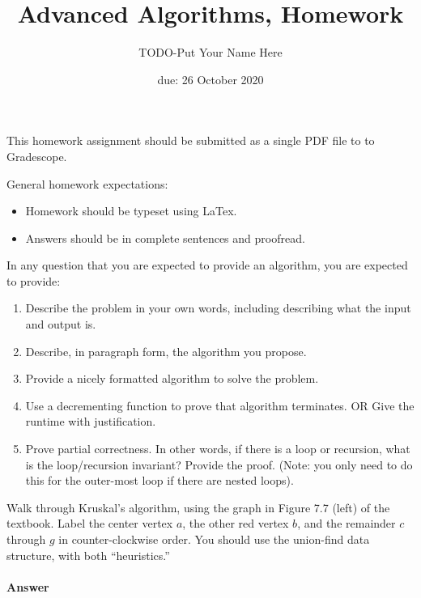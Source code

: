 \documentclass{article}
\title{Advanced Algorithms, Homework \hwnum}
\author{TODO-Put Your Name Here}
\date{due: 26 October 2020}
\begin{document}
\maketitle

This homework assignment should be
submitted as a single PDF file to to Gradescope.

General homework expectations:
\begin{itemize}
    \item Homework should be typeset using LaTex.
    \item Answers should be in complete sentences and proofread.
\end{itemize}

In any question that you are expected to provide an algorithm, you are
expected to provide:
\begin{enumerate}
    \item Describe the problem in your own words, including
        describing what the input and output is.
    \item Describe, in paragraph form, the algorithm you propose.
    \item Provide a nicely formatted algorithm to solve the problem.
    \item Use a decrementing function to prove that algorithm terminates.
            OR  Give the runtime with justification.
    \item Prove partial correctness.  In other words, if there is a loop or
        recursion, what is the loop/recursion invariant? Provide the proof.
        (Note: you only need to do this for the outer-most loop if there are
        nested loops).
\end{enumerate}



\nextprob
{}

Walk through Kruskal's algorithm, using the graph in Figure 7.7 (left) of the
textbook.  Label the center vertex $a$, the other red vertex $b$, and the
remainder $c$ through $g$ in counter-clockwise order.  You should use the
union-find data structure, with both ``heuristics.''

\paragraph{Answer}

\end{document}

